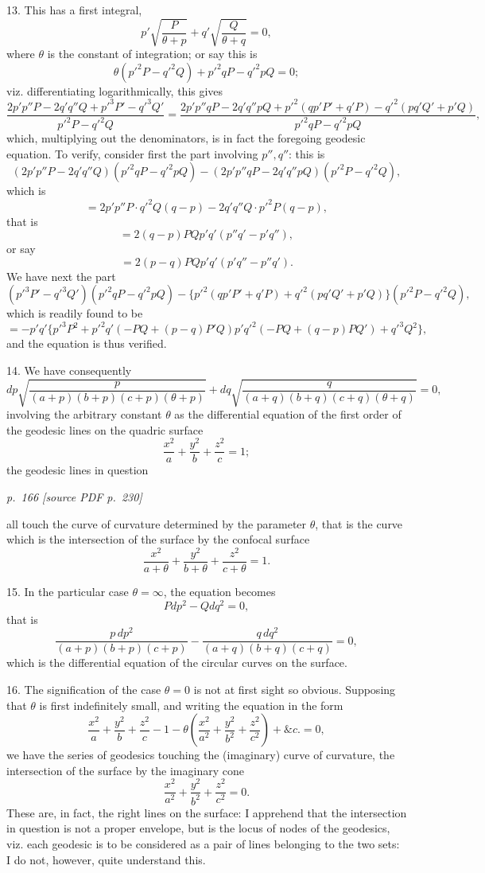 \documentclass[11pt,a4paper]{article}
\newcommand{\sourcepage}[2]{%
  \bigskip
  \noindent\textit{p.~#1 [source PDF p.~#2]}%
  \par\smallskip
}
\begin{document}
13. This has a first integral,
\[
p'\sqrt{\frac{P}{\theta+p}}+q'\sqrt{\frac{Q}{\theta+q}}=0,
\]
where \(\theta\) is the constant of integration; or say this is
\[
\theta(p'^2P-q'^2Q)+p'^2qP-q'^2pQ=0;
\]
viz. differentiating logarithmically, this gives
\[
\frac{2p'p''P-2q'q''Q+p'^3P'-q'^3Q'}{p'^2P-q'^2Q}
=
\frac{2p'p''qP-2q'q''pQ+p'^2(qp'P'+q'P)-q'^2(pq'Q'+p'Q)}
     {p'^2qP-q'^2pQ},
\]
which, multiplying out the denominators, is in fact the foregoing geodesic equation.
To verify, consider first the part involving \(p'',q''\): this is
\[
(2p'p''P-2q'q''Q)(p'^2qP-q'^2pQ)
-(2p'p''qP-2q'q''pQ)(p'^2P-q'^2Q),
\]
which is
\[
=2p'p''P\cdot q'^2Q(q-p)-2q'q''Q\cdot p'^2P(q-p),
\]
that is
\[
=2(q-p)PQp'q'(p''q'-p'q''),
\]
or say
\[
=2(p-q)PQp'q'(p'q''-p''q').
\]
We have next the part
\[
(p'^3P'-q'^3Q')(p'^2qP-q'^2pQ)
-\{p'^2(qp'P'+q'P)+q'^2(pq'Q'+p'Q)\}(p'^2P-q'^2Q),
\]
which is readily found to be
\[
=-p'q'\{p'^3P^2+p'^2q'(-PQ+(p-q)P'Q)
p'q'^2(-PQ+(q-p)PQ')+q'^3Q^2\},
\]
and the equation is thus verified.

14. We have consequently
\[
dp\sqrt{\frac{p}{(a+p)(b+p)(c+p)(\theta+p)}}
+dq\sqrt{\frac{q}{(a+q)(b+q)(c+q)(\theta+q)}}=0,
\]
involving the arbitrary constant \(\theta\) as the differential equation of the first
order of the geodesic lines on the quadric surface
\[
\frac{x^2}{a}+\frac{y^2}{b}+\frac{z^2}{c}=1;
\]
the geodesic lines in question

\sourcepage{166}{230}

all touch the curve of curvature determined by the parameter \(\theta\), that is the
curve which is the intersection of the surface by the confocal surface
\[
\frac{x^2}{a+\theta}+\frac{y^2}{b+\theta}+\frac{z^2}{c+\theta}=1.
\]

15. In the particular case \(\theta=\infty\), the equation becomes
\[
Pdp^2-Qdq^2=0,
\]
that is
\[
\frac{p\,dp^2}{(a+p)(b+p)(c+p)}
-\frac{q\,dq^2}{(a+q)(b+q)(c+q)}=0,
\]
which is the differential equation of the circular curves on the surface.

16. The signification of the case \(\theta=0\) is not at first sight so obvious.
Supposing that \(\theta\) is first indefinitely small, and writing the equation in the
form
\[
\frac{x^2}{a}+\frac{y^2}{b}+\frac{z^2}{c}-1
-\theta\left(\frac{x^2}{a^2}+\frac{y^2}{b^2}+\frac{z^2}{c^2}\right)+\&c.=0,
\]
we have the series of geodesics touching the (imaginary) curve of curvature, the
intersection of the surface by the imaginary cone
\[
\frac{x^2}{a^2}+\frac{y^2}{b^2}+\frac{z^2}{c^2}=0.
\]
These are, in fact, the right lines on the surface: I apprehend that the intersection
in question is not a proper envelope, but is the locus of nodes of the geodesics,
viz. each geodesic is to be considered as a pair of lines belonging to the two sets:
I do not, however, quite understand this.
\end{document}
